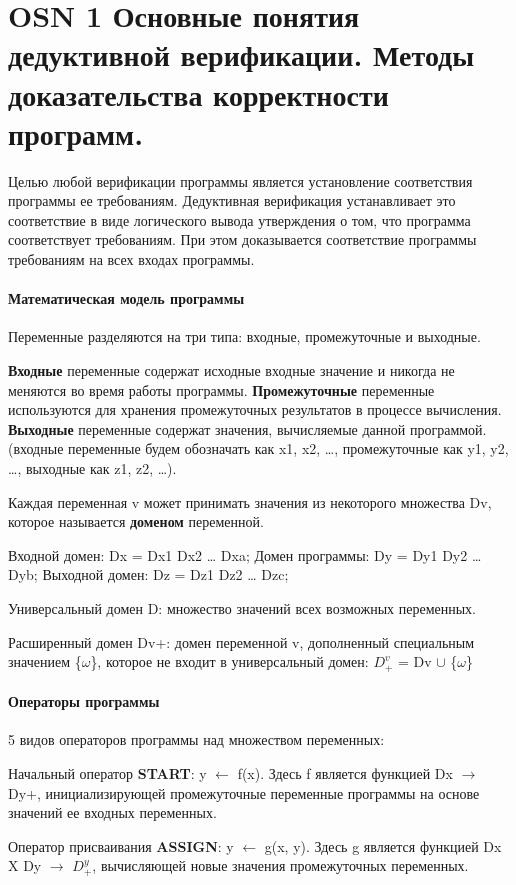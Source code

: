 \section*{OSN 1 Основные понятия дедуктивной верификации. Методы доказательства корректности программ.}

Целью любой верификации программы является установление соответствия программы ее требованиям. Дедуктивная верификация устанавливает это соответствие в виде логического вывода утверждения о том, что программа соответствует требованиям. При этом доказывается соответствие программы требованиям на всех входах программы.
\paragraph{Математическая модель программы}

Переменные разделяются на три типа: входные, промежуточные и выходные.

\textbf{Входные} переменные содержат исходные входные значение и никогда не меняются во время работы программы. \textbf{Промежуточные} переменные используются для хранения промежуточных результатов в процессе вычисления. \textbf{Выходные} переменные содержат значения, вычисляемые данной программой.(входные переменные будем обозначать как x1, x2, …, промежуточные как y1, y2, …, выходные как z1, z2, …).

Каждая переменная v может принимать значения из некоторого множества Dv, которое называется \textbf{доменом} переменной.

Входной домен: Dx = Dx1  Dx2  …  Dxa; Домен программы: Dy = Dy1  Dy2  …  Dyb; Выходной домен: Dz = Dz1  Dz2  …  Dzc; 

Универсальный домен D: множество значений всех возможных переменных.

Расширенный домен Dv+: домен переменной v, дополненный специальным значением \{$\omega$\}, которое не входит в универсальный домен: $D^v_+$ = Dv $\cup$ \{$\omega$\}

\paragraph{Операторы программы}
5 видов операторов программы над множеством переменных:

Начальный оператор \textbf{START}: y $\leftarrow$  f(x). Здесь f является функцией Dx $\rightarrow$ Dy+, инициализирующей промежуточные переменные программы на основе значений ее входных переменных.

Оператор присваивания \textbf{ASSIGN}: y $\leftarrow$ g(x, y). Здесь g является функцией                 Dx X Dy $\rightarrow$ $D^y_+$, вычисляющей новые значения промежуточных переменных.


